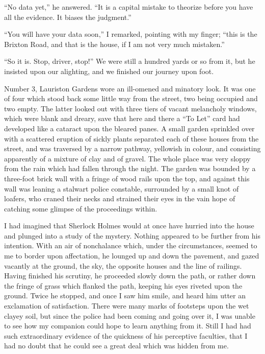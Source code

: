 \documentclass[12pt]{book}
\begin{document}
“No data yet,” he answered. “It is a capital mistake to theorize before you have all the evidence. It biases the judgment.” 

“You will have your data soon,” I remarked, pointing with my finger; “this is the Brixton Road, and that is the house, if I am not very much mistaken.” 

“So it is. Stop, driver, stop!” We were still a hundred yards or so from it, but he insisted upon our alighting, and we finished our journey upon foot. 

Number 3, Lauriston Gardens wore an ill-omened and minatory look. It was one of four which stood back some little way from the street, two being occupied and two empty. The latter looked out with three tiers of vacant melancholy windows, which were blank and dreary, save that here and there a “To Let” card had developed like a cataract upon the bleared panes. A small garden sprinkled over with a scattered eruption of sickly plants separated each of these houses from the street, and was traversed by a narrow pathway, yellowish in colour, and consisting apparently of a mixture of clay and of gravel. The whole place was very sloppy from the rain which had fallen through the night. The garden was bounded by a three-foot brick wall with a fringe of wood rails upon the top, and against this wall was leaning a stalwart police constable, surrounded by a small knot of loafers, who craned their necks and strained their eyes in the vain hope of catching some glimpse of the proceedings within. 

I had imagined that Sherlock Holmes would at once have hurried into the house and plunged into a study of the mystery. Nothing appeared to be further from his intention. With an air of nonchalance which, under the circumstances, seemed to me to border upon affectation, he lounged up and down the pavement, and gazed vacantly at the ground, the sky, the opposite houses and the line of railings. Having finished his scrutiny, he proceeded slowly down the path, or rather down the fringe of grass which flanked the path, keeping his eyes riveted upon the ground. Twice he stopped, and once I saw him smile, and heard him utter an exclamation of satisfaction. There were many marks of footsteps upon the wet clayey soil, but since the police had been coming and going over it, I was unable to see how my companion could hope to learn anything from it. Still I had had such extraordinary evidence of the quickness of his perceptive faculties, that I had no doubt that he could see a great deal which was hidden from me. 
\end{document}
